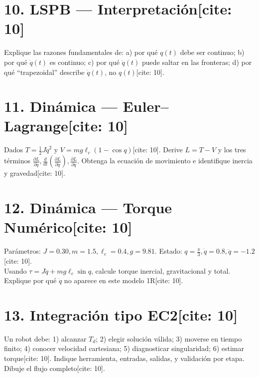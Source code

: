 \documentclass[11pt, a4paper]{article}
\begin{document}
\section*{10. LSPB — Interpretación[cite: 10]}
Explique las razones fundamentales de: a) por qué $q(t)$ debe ser continuo; b) por qué $\dot{q}(t)$ es continuo; c) por qué $\ddot{q}(t)$ puede saltar en las fronteras; d) por qué “trapezoidal” describe $\dot{q}(t)$, no $q(t)$[cite: 10].
\vspace{2.5cm}

\section*{11. Dinámica — Euler–Lagrange[cite: 10]}
Dados $T = \frac{1}{2}J\dot{q}^2$ y $V = mg\ell_c(1 - \cos q)$[cite: 10]. 
Derive $L = T - V$ y los tres términos $\frac{\partial L}{\partial \dot{q}}, \frac{d}{dt}\left(\frac{\partial L}{\partial \dot{q}}\right), \frac{\partial L}{\partial q}$. Obtenga la ecuación de movimiento e identifique inercia y gravedad[cite: 10].
\vspace{3cm}

\section*{12. Dinámica — Torque Numérico[cite: 10]}
Parámetros: $J=0.30, m=1.5, \ell_c=0.4, g=9.81$. Estado: $q=\frac{\pi}{3}, \dot{q}=0.8, \ddot{q}=-1.2$[cite: 10]. \\
Usando $\tau = J\ddot{q} + mg\ell_c\sin q$, calcule torque inercial, gravitacional y total. Explique por qué $\dot{q}$ no aparece en este modelo 1R[cite: 10].
\vspace{2.5cm}

\section*{13. Integración tipo EC2[cite: 10]}
Un robot debe: 1) alcanzar $T_d$; 2) elegir solución válida; 3) moverse en tiempo finito; 4) conocer velocidad cartesiana; 5) diagnosticar singularidad; 6) estimar torque[cite: 10]. Indique herramienta, entradas, salidas, y validación por etapa. Dibuje el flujo completo[cite: 10].
\vspace{3cm}

\newpage
\end{document}
